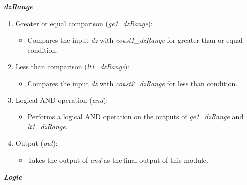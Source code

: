 \vspace{0.5cm}

\textit{\textbf{dzRange}}

\begin{enumerate}

\item Greater or equal comparison (\textit{ge1\_dzRange}):
\begin{itemize}
\item Compares the input \textit{dz} with \textit{const1\_dzRange} for greater than or equal condition.
\end{itemize}

\item Less than comparison (\textit{lt1\_dzRange}):
\begin{itemize}
\item Compares the input \textit{dz} with \textit{const2\_dzRange} for less than condition.
\end{itemize}

\item Logical AND operation (\textit{and}):
\begin{itemize}
\item Performs a logical AND operation on the outputs of \textit{ge1\_dzRange} and \textit{lt1\_dzRange}.
\end{itemize}

\item Output (\textit{out}):
\begin{itemize}
\item Takes the output of \textit{and} as the final output of this module.
\end{itemize}

\end{enumerate}

\vspace{0.5cm}

\textbf{\textit{Logic}}


